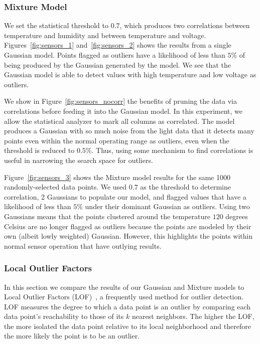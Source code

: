 \subsubsection{Mixture Model}
We set the statistical threshold to $0.7$, which produces two correlations between temperature and humidity and between temperature and voltage.
Figures~\ref{fig:sensors_1} and~\ref{fig:sensors_2} shows the results from a single Gaussian model.
Points flagged as outliers have a likelihood of less than $5\%$ of being produced by the Gaussian generated by the model.
We see that the Gaussian model is able to detect values with high temperature and low voltage as outliers.
 
We show in Figure~\ref{fig:sensors_nocorr} the benefits of pruning the data via correlations before feeding it into the Gaussian model.
In this experiment, we allow the statistical analyzer to mark all columns as correlated.
The model produces a Gaussian with so much noise from the light data that it detects many points even within the normal operating range as outliers, even when the threshold is reduced to $0.5\%$. 
Thus, using some mechanism to find correlations is useful in narrowing the search space for outliers.
 
Figure~\ref{fig:sensors_3} shows the Mixture model results for the same 1000 randomly-selected data points. 
We used $0.7$ as the threshold to determine correlation, 2 Gaussians to populate our model, and flagged values that have a likelihood of less than $5\%$ under their dominant Gaussian as outliers.
Using two Gaussians means that the points clustered around the temperature $120$ degrees Celsius are no longer flagged as outliers because the points are modeled by their own (albeit lowly weighted) Gaussian.
However, this highlights the points within normal sensor operation that have outlying results.
 


\subsubsection{Local Outlier Factors}
\label{sec:lof-evaluation}

In this section we compare the results of our Gaussian and Mixture models to Local Outlier Factors (LOF)~\cite{Breunig2000}, a frequently used method for outlier detection.
LOF measures the degree to which a data point is an outlier by comparing each data point's reachability to those of its $k$ nearest neighbors.
The higher the LOF, the more isolated the data point relative to its local neighborhood and therefore the more likely the point is to be an outlier.

